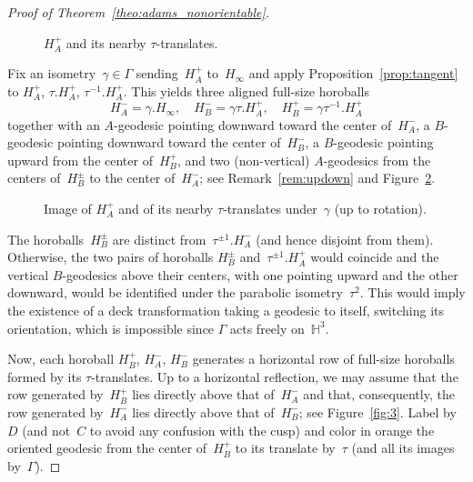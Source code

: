 \documentclass[11pt,reqno]{amsart}
\theoremstyle{definition}
\numberwithin{equation}{section}
\newcommand{\HH}{{\mathbb H}}
\numberwithin{equation}{section}
\begin{document}
\begin{proof}[Proof of Theorem~\ref{theo:adams_nonorientable}]
\medskip

\begin{figure}[htbp!]
\vspace{0.4cm}
\centering
\def\svgwidth{0.25\textheight}

\vspace{0.5cm}
\caption{$H_A^+$ and its nearby $\tau$-translates.} \label{fig:1}
\end{figure}


Fix an isometry~$\gamma \in \Gamma$ sending~$H_A^+$ to~$H_\infty$ and apply Proposition~\ref{prop:tangent} to $H_A^+$, $\tau.H_A^+$, $\tau^{-1}.H_A^+$.
This yields three aligned full-size horoballs
\[
H_A^-=\gamma.H_\infty, \quad H_B^-=\gamma \tau.H_A^+, \quad H_B^+= \gamma \tau^{-1}.H_A^+
\]
together with an $A$-geodesic pointing downward toward the center of~$H_A^-$, a $B$-geodesic pointing downward toward the center of~$H_B^-$, a $B$-geodesic pointing upward from the center of~$H_B^+$, and two (non-vertical) $A$-geodesics from the centers of~$H_B^{\pm}$ to the center of~$H_A^-$; see Remark~\ref{rem:updown} and Figure~\ref{fig:2}. 

\medskip

\begin{figure}[htbp!]
\vspace{3.4cm}
\centering
\def\svgwidth{0.16\textheight}

\caption{Image of $H_A^+$ and of its nearby $\tau$-translates under~$\gamma$ (up to rotation).} \label{fig:2}
\end{figure}

The horoballs~$H_B^\pm$ are distinct from~$\tau^{\pm 1}. H_A^-$ (and hence disjoint from them).
Otherwise, the two pairs of horoballs $H_B^{\pm}$  and~$\tau^{\pm 1}. H_A^+$ would coincide and the vertical $B$-geodesics above their centers, with one pointing upward and the other downward, would be identified under the parabolic isometry~$\tau^2$.
This would imply the existence of a deck transformation taking a geodesic to itself, switching its orientation, which is impossible since $\Gamma$ acts freely on~$\HH^3$.

\medskip

Now, each horoball $H_B^+$, $H_A^-$, $H_B^-$ generates a horizontal row of full-size horoballs formed by its $\tau$-translates.
Up to a horizontal reflection, we may assume that the row generated by~$H_B^+$ lies directly above that of~$H_A^-$ and that, consequently, the row generated by~$H_A^-$ lies directly above that of~$H_B^-$; see Figure~\ref{fig:3}.
Label by~$D$ (and not~$C$ to avoid any confusion with the cusp) and color in orange the oriented geodesic from the center of~$H_B^+$ to its translate by~$\tau$ (and all its images by~$\Gamma$).


\end{proof}
\end{document}
